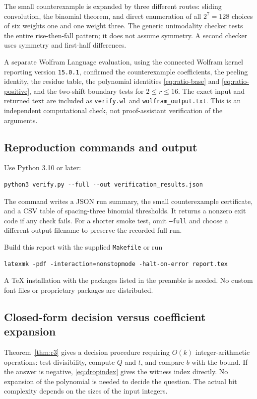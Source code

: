 \documentclass[11pt]{article}
\theoremstyle{research}
\theoremstyle{definition}
\numberwithin{equation}{section}
\begin{document}
The small counterexample is expanded by three different routes:
sliding convolution, the binomial theorem, and direct enumeration of
all $2^7=128$ choices of six weights one and one weight three.
The generic unimodality checker tests the entire rise-then-fall pattern;
it does not assume symmetry. A second checker uses symmetry and
first-half differences.

A separate Wolfram Language evaluation, using the connected
Wolfram kernel reporting version \texttt{15.0.1}, confirmed the
counterexample coefficients, the peeling identity, the residue table,
the polynomial identities \eqref{eq:ratio-base} and
\eqref{eq:ratio-positive}, and the two-shift boundary tests for
$2\le r\le16$. The exact input and returned text are included as
\texttt{verify.wl} and \texttt{wolfram\_output.txt}.
This is an independent computational check, not proof-assistant
verification of the arguments.

\subsection{Reproduction commands and output}
Use Python 3.10 or later:
\begin{lstlisting}
python3 verify.py --full --out verification_results.json
\end{lstlisting}
The command writes a JSON run summary, the small counterexample
certificate, and a CSV table of spacing-three binomial thresholds.
It returns a nonzero exit code if any check fails.
For a shorter smoke test, omit \texttt{--full} and choose a different
output filename to preserve the recorded full run.

Build this report with the supplied \texttt{Makefile} or run
\begin{lstlisting}
latexmk -pdf -interaction=nonstopmode -halt-on-error report.tex
\end{lstlisting}
A TeX installation with the packages listed in the preamble is needed.
No custom font files or proprietary packages are distributed.

\subsection{Closed-form decision versus coefficient expansion}
Theorem~\ref{thm:r3} gives a decision procedure requiring $O(k)$
integer-arithmetic operations: test divisibility, compute $Q$ and $t$,
and compare $b$ with the bound. If the answer is negative,
\eqref{eq:dropindex} gives the witness index directly.
No expansion of the polynomial is needed to decide the question.
The actual bit complexity depends on the sizes of the input integers.
\end{document}
